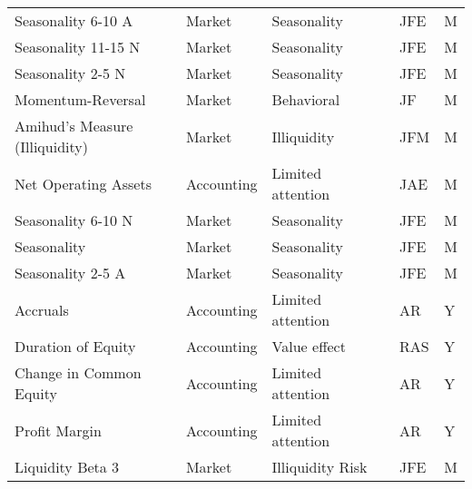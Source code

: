\begin{tabular}{llllll}
Seasonality 6-10 A                         &             Market &            Seasonality &       \cite{heston2008seasonality} &     JFE &         M \\
Seasonality 11-15 N                        &             Market &            Seasonality &       \cite{heston2008seasonality} &     JFE &         M \\
Seasonality 2-5 N                          &             Market &            Seasonality &       \cite{heston2008seasonality} &     JFE &         M \\
Momentum-Reversal                          &             Market &             Behavioral &        \cite{jegadeesh1993returns} &      JF &         M \\
Amihud's Measure (Illiquidity)             &             Market &            Illiquidity &       \cite{amihud2002illiquidity} &     JFM &         M \\
Net Operating Assets                       &         Accounting &      Limited attention &    \cite{hirshleifer2004investors} &     JAE &         M \\
Seasonality 6-10 N                         &             Market &            Seasonality &       \cite{heston2008seasonality} &     JFE &         M \\
Seasonality                                &             Market &            Seasonality &       \cite{heston2008seasonality} &     JFE &         M \\
Seasonality 2-5 A                          &             Market &            Seasonality &       \cite{heston2008seasonality} &     JFE &         M \\
Accruals                                   &         Accounting &      Limited attention &             \cite{sloan1996create} &      AR &         Y \\
Duration of Equity                         &         Accounting &           Value effect &           \cite{dechow2004implied} &     RAS &         Y \\
Change in Common Equity                    &         Accounting &      Limited attention &  \cite{richardson2006implications} &      AR &         Y \\
Profit Margin                              &         Accounting &      Limited attention &              \cite{soliman2008use} &      AR &         Y \\
Liquidity Beta 3                           &             Market &       Illiquidity Risk &            \cite{acharya2005asset} &     JFE &         M \\

\end{tabular}

